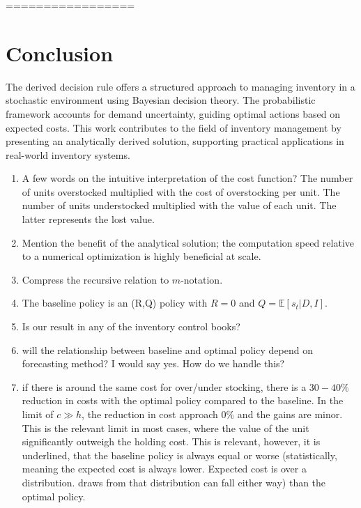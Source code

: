 \documentclass[a4paper,12pt]{article}
\theoremstyle{definition}
\begin{document}
	=================
	

	
	\section{Conclusion}
	The derived decision rule offers a structured approach to managing inventory in a stochastic environment using Bayesian decision theory. The probabilistic framework accounts for demand uncertainty, guiding optimal actions based on expected costs. This work contributes to the field of inventory management by presenting an analytically derived solution, supporting practical applications in real-world inventory systems.
	
	\begin{enumerate}
		\item A few words on the intuitive interpretation of the cost function? The number of units overstocked multiplied with the cost of overstocking per unit. The number of units understocked multiplied with the value of each unit. The latter represents the lost value.
		\item Mention the benefit of the analytical solution; the computation speed relative to a numerical optimization is highly beneficial at scale.
		\item Compress the recursive relation to $m$-notation. 
		\item The baseline policy is an (R,Q) policy with $R =0$ and $Q = \mathbb{E}[s_t|D,I]$.
		\item Is our result in any of the inventory control books?
		\item will the relationship between baseline and optimal policy depend on forecasting method? I would say yes. How do we handle this?
		
		\item if there is around the same cost for over/under stocking, there is a $30-40\%$ reduction in costs with the optimal policy compared to the baseline. In the limit of $c\gg h$, the reduction in cost approach $0\%$ and the gains are minor. This is the relevant limit in most cases, where the value of the unit significantly outweigh the holding cost. This is relevant, however, it is underlined, that the baseline policy is always equal or worse (statistically, meaning the expected cost is always lower. Expected cost is over a distribution. draws from that distribution can fall either way) than the optimal policy. 
	\end{enumerate}
	
\end{document}
